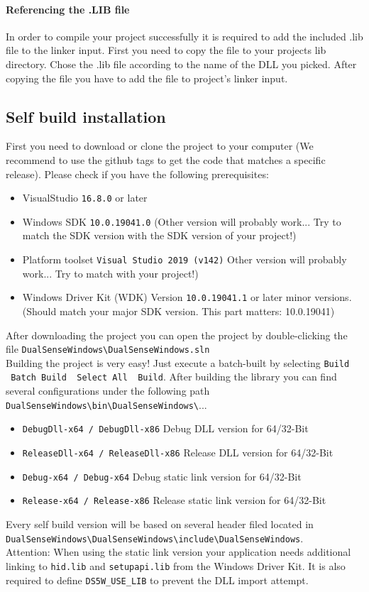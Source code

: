 \paragraph{Referencing the .LIB file}
In order to compile your project successfully it is required to add the included .lib file to the linker input. First you need to copy the file to your projects lib directory. Chose the .lib file according to the name of the DLL you picked. After copying the file you have to add the file to project's linker input.  

\subsection{Self build installation}
First you need to download or clone the project to your computer (We recommend to use the github tags to get the code that matches a specific release). Please check if you have the following prerequisites:
\begin{itemize}
	\item VisualStudio \texttt{16.8.0} or later
	\item Windows SDK \texttt{10.0.19041.0} (Other version will probably work... Try to match the SDK version with the SDK version of your project!)
	\item Platform toolset \texttt{Visual Studio 2019 (v142)} Other version will probably work... Try to match with your project!)
	\item Windows Driver Kit (WDK) Version \texttt{10.0.19041.1} or later minor versions. (Should match your major SDK version. This part matters: 10.0.19041)
\end{itemize}
After downloading the project you can open the project by double-clicking the file \texttt{DualSenseWindows\textbackslash DualSenseWindows.sln}\\
Building the project is very easy! Just execute a batch-built by selecting \texttt{Build \textrightarrow \ Batch Build \textrightarrow \ Select All \textrightarrow \ Build}. After building the library you can find several configurations under the following path\\
\texttt{DualSenseWindows\textbackslash bin\textbackslash DualSenseWindows\textbackslash}...
\begin{itemize}
	\item \texttt{DebugDll-x64 / DebugDll-x86} Debug DLL version for 64/32-Bit
	\item \texttt{ReleaseDll-x64 / ReleaseDll-x86} Release DLL version for 64/32-Bit
	\item \texttt{Debug-x64 / Debug-x64} Debug static link version for 64/32-Bit
	\item \texttt{Release-x64 / Release-x86} Release static link version for 64/32-Bit
\end{itemize}
Every self build version will be based on several header filed located in \texttt{DualSenseWindows\textbackslash DualSenseWindows\textbackslash include\textbackslash DualSenseWindows}.\\
Attention: When using the static link version your application needs additional linking to \texttt{hid.lib} and \texttt{setupapi.lib} from the Windows Driver Kit. It is also required to define \texttt{DS5W\_USE\_LIB} to prevent the DLL import attempt. 

\newpage